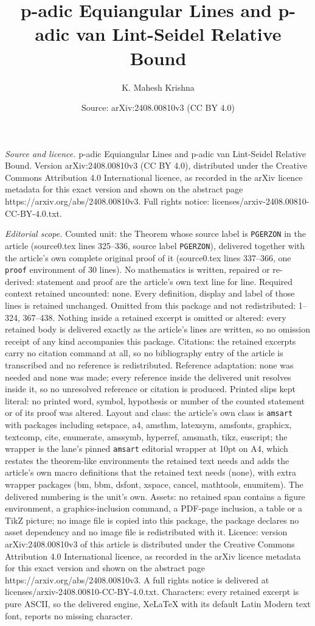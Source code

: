 \documentclass[10pt,a4paper]{amsart}
\title[p-adic Equiangular Lines and p-adic van Lint-Seidel Relative]{p-adic Equiangular Lines and p-adic van Lint-Seidel Relative Bound}
\author{K. Mahesh Krishna}
\date{Source: arXiv:2408.00810v3 (CC BY 4.0)}
\begin{document}
\maketitle

\noindent\emph{Source and licence.} p-adic Equiangular Lines and p-adic van Lint-Seidel Relative Bound. Version arXiv:2408.00810v3 (CC BY 4.0), distributed under the Creative Commons Attribution 4.0 International licence, as recorded in the arXiv licence metadata for this exact version and shown on the abstract page https://arxiv.org/abs/2408.00810v3. Full rights notice: licenses/arxiv-2408.00810-CC-BY-4.0.txt.\par\smallskip

\noindent\textit{Editorial scope.} Counted unit: the Theorem whose source label is \texttt{PGERZON} in the article (source0.tex lines 325--336, source label \texttt{PGERZON}), delivered together with the article's own complete original proof of it (source0.tex lines 337--366, one \texttt{proof} environment of 30 lines). No mathematics is written, repaired or re-derived: statement and proof are the article's own text line for line. Required context retained uncounted: none. Every definition, display and label of those lines is retained unchanged. Omitted from this package and not redistributed: 1--324, 367--438. Nothing inside a retained excerpt is omitted or altered: every retained body is delivered exactly as the article's lines are written, so no omission receipt of any kind accompanies this package. Citations: the retained excerpts carry no citation command at all, so no bibliography entry of the article is transcribed and no reference is redistributed. Reference adaptation: none was needed and none was made; every reference inside the delivered unit resolves inside it, so no unresolved reference or citation is produced. Printed slips kept literal: no printed word, symbol, hypothesis or number of the counted statement or of its proof was altered. Layout and class: the article's own class is \texttt{amsart} with packages including setspace, a4, amsthm, latexsym, amsfonts, graphicx, textcomp, cite, enumerate, amssymb, hyperref, amsmath, tikz, euscript; the wrapper is the lane's pinned \texttt{amsart} editorial wrapper at 10pt on A4, which restates the theorem-like environments the retained text needs and adds the article's own macro definitions that the retained text needs (none), with extra wrapper packages (bm, bbm, dsfont, xspace, cancel, mathtools, enumitem). The delivered numbering is the unit's own. Assets: no retained span contains a figure environment, a graphics-inclusion command, a PDF-page inclusion, a table or a TikZ picture; no image file is copied into this package, the package declares no asset dependency and no image file is redistributed with it. Licence: version arXiv:2408.00810v3 of this article is distributed under the Creative Commons Attribution 4.0 International licence, as recorded in the arXiv licence metadata for this exact version and shown on the abstract page https://arxiv.org/abs/2408.00810v3. A full rights notice is delivered at licenses/arxiv-2408.00810-CC-BY-4.0.txt. Characters: every retained excerpt is pure ASCII, so the delivered engine, XeLaTeX with its default Latin Modern text font, reports no missing character.
\end{document}
